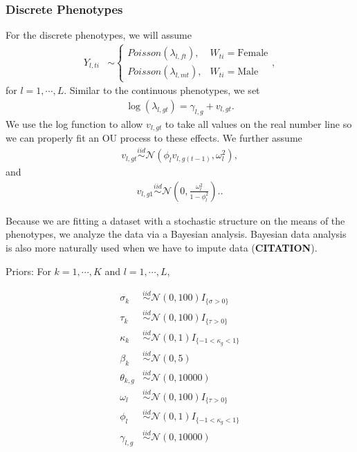 \documentclass[
  12pt,
]{article}
\begin{document}
\hypertarget{discrete-phenotypes}{%
\subsubsection{Discrete Phenotypes}\label{discrete-phenotypes}}

For the discrete phenotypes, we will assume \begin{align}
{Y}_{l,ti} & \sim \left\{\begin{array}{ll} Poisson(\lambda_{l,ft}), & W_{ti} = \text{Female} \\ Poisson(\lambda_{l,mt}), & W_{ti} = \text{Male} \end{array}\right.,
\label{eq:Y}
\end{align} for \(l = 1,\cdots,L\). Similar to the continuous
phenotypes, we set \begin{align}
\log(\lambda_{l,gt}) = \gamma_{l,g} + v_{l,gt}.
\label{eq:lambda}
\end{align} We use the log function to allow \(v_{l,gt}\) to take all
values on the real number line so we can properly fit an OU process to
these effects. We further assume \begin{align}
v_{l,gt} \overset{iid}{\sim}\mathcal{N}(\phi_{l} v_{l,g(t-1)} , \omega_l^2),
\label{eq:v_ar1}
\end{align} and \begin{align}
v_{l,g1} \overset{iid}{\sim}\mathcal{N}\left(0,\frac{\omega_l^2}{1 - \phi_{l}^2}\right)..
\label{eq:v1}
\end{align}

Because we are fitting a dataset with a stochastic structure on the
means of the phenotypes, we analyze the data via a Bayesian analysis.
Bayesian data analysis is also more naturally used when we have to
impute data (\textbf{CITATION}).

Priors: For \(k = 1,\cdots,K\) and \(l = 1,\cdots,L\),

\begin{align}
\sigma_k & \overset{iid}{\sim}\mathcal{N}(0,100)I_{\{\sigma > 0\}} \nonumber \\
\tau_k & \overset{iid}{\sim}\mathcal{N}(0,100)I_{\{\tau > 0\}} \nonumber \\
\kappa_k & \overset{iid}{\sim}\mathcal{N}(0,1)I_{\{-1 < \kappa_g < 1\}} \nonumber \\
\beta_k & \overset{iid}{\sim}\mathcal{N}(0,5) \nonumber \\
\theta_{k,g} & \overset{iid}{\sim}\mathcal{N}(0,10000) \nonumber \\
\omega_l & \overset{iid}{\sim}\mathcal{N}(0,100)I_{\{\tau > 0\}} \nonumber \\
\phi_l & \overset{iid}{\sim}\mathcal{N}(0,1)I_{\{-1 < \kappa_g < 1\}} \nonumber \\
\gamma_{l,g} & \overset{iid}{\sim}\mathcal{N}(0,10000)
\label{eq:priors}
\end{align}
\end{document}
